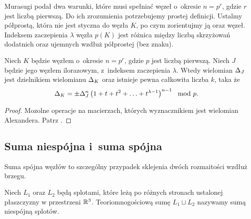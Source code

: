 Murasugi podał dwa warunki, które musi spełniać węzeł o~okresie $n = p^r$, gdzie $r$ jest liczbą pierwszą.
Do ich zrozumienia potrzebujemy prostej definicji.
Ustalmy półprostą, która nie jest styczna do węzła $K$, po czym zorientujmy ją oraz węzeł.
Indeksem zaczepienia $\lambda$ węzła $p(K)$ jest różnica między liczbą skrzyżowań dodatnich oraz ujemnych wzdłuż półprostej (bez znaku).

\begin{proposition}
    \label{murasugi_periodic}
    Niech $K$ będzie węzłem o~okresie $n = p^r$, gdzie $p$ jest liczbą pierwszą.
    Niech $J$ będzie jego węzłem ilorazowym, z~indeksem zaczepienia $\lambda$.
    Wtedy wielomian $\Delta_J$ jest dzielnikiem wielomianu $\Delta_K$ oraz istnieje pewna całkowita liczba $k$, taka że
    \[
        \Delta_K = \pm \Delta_J^n \left(1 + t + t^2 + \ldots + t^{\lambda - 1}\right)^{n-1} \mod p.
    \]
\end{proposition}

\begin{proof}
    Mozolne operacje na macierzach, których wyznacznikiem jest wielomian Alexandera.
    Patrz \cite{murasugi71}.
\end{proof}


\subsection{Suma niespójna i~suma spójna} %
\label{sub:knot_sum}
Suma spójna węzłów to szczególny przypadek sklejenia dwóch rozmaitości wzdłuż brzegu.

\begin{definition}
    Niech $L_1$ oraz $L_2$ będą splotami, które leżą po różnych stronach ustalonej płaszczyzny w przestrzeni $\mathbb R^3$.
    Teoriomnogościową sumę $L_1 \sqcup L_2$ nazywamy sumą niespójną splotów.
\end{definition}


